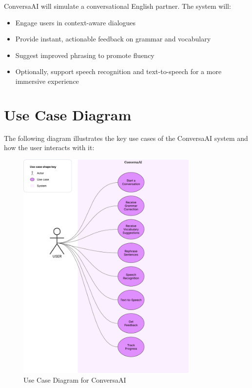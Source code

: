 \documentclass[12pt]{article}
\begin{document}
ConversaAI will simulate a conversational English partner. The system will:
\begin{itemize}
    \item Engage users in context-aware dialogues
    \item Provide instant, actionable feedback on grammar and vocabulary
    \item Suggest improved phrasing to promote fluency
    \item Optionally, support speech recognition and text-to-speech for a more immersive experience
\end{itemize}

\section*{Use Case Diagram}

The following diagram illustrates the key use cases of the ConversaAI system and how the user interacts with it:

\begin{figure}[h!]
    \centering
    \includegraphics[width=0.8\textwidth]{Use_case_diagram.png}
    \caption{Use Case Diagram for ConversaAI}
    \label{fig:use_case_diagram}
\end{figure}
\end{document}
